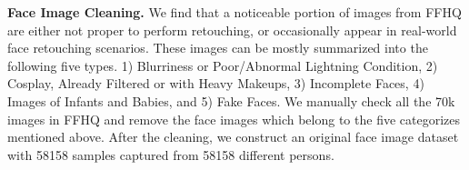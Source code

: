 \documentclass[sigconf]{acmart}
\begin{document}
\noindent\textbf{Face Image Cleaning.}
We find that a noticeable portion of images from FFHQ are either not proper to perform retouching, or occasionally appear in real-world face retouching scenarios. These images can be mostly summarized into the following five types.%
1) Blurriness or Poor/Abnormal Lightning Condition, 
2) Cosplay, Already Filtered or with Heavy Makeups, 
3) Incomplete Faces,
4) Images of Infants and Babies, and
5) Fake Faces.
We manually check all the 70k images in FFHQ and remove the face images which belong to the five categorizes mentioned above. After the cleaning, we construct an original face image dataset with 58158 samples captured from 58158 different persons. 
\end{document}

